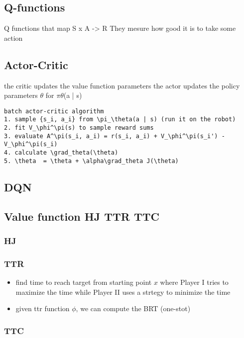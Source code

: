 \documentclass[11pt]{article}
\begin{document}
\subsection{Q-functions}
\label{sec:org4d1b6fc}
Q functions that map S x A -> R
They mesure how good it is to take some action

\subsection{Actor-Critic}
\label{sec:orgbe3d4d7}
the critic updates the value function parameters
the actor updates the policy parameters \(\theta\) for \(\pi \theta\)(a | s)
\begin{verbatim}
batch actor-critic algorithm
1. sample {s_i, a_i} from \pi_\theta(a | s) (run it on the robot)
2. fit V_\phi^\pi(s) to sample reward sums
3. evaluate A^\pi(s_i, a_i) = r(s_i, a_i) + V_\phi^\pi(s_i') - V_\phi^\pi(s_i)
4. calculate \grad_theta(\theta)
5. \theta  = \theta + \alpha\grad_theta J(\theta)

\end{verbatim}


\subsection{DQN}
\label{sec:org5bf4669}

\subsection{Value function HJ TTR TTC}
\label{sec:orgebe4578}
\subsubsection{HJ}
\label{sec:org1fe8502}
\subsubsection{TTR}
\label{sec:orgcef57ef}
\begin{itemize}
\item find time to reach target from starting point \(x\) where Player I tries to maximize the time while Player II uses a strtegy to minimize the time
\item given ttr function \(\phi\), we can compute the BRT (one-stot)
\end{itemize}

\subsubsection{TTC}
\label{sec:org5b02578}
\end{document}
